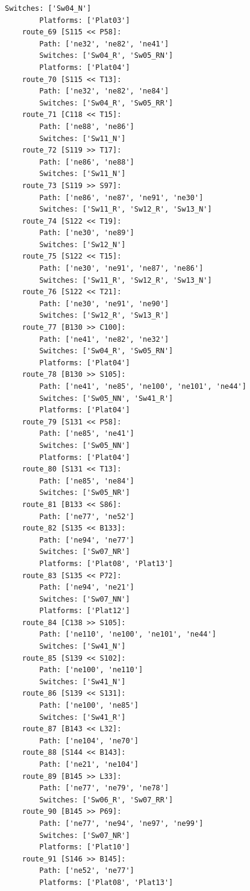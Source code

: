 \begin{lstlisting}[language = {}, tabsize=4, basicstyle=\footnotesize\ttfamily, showspaces=false, showstringspaces=false, caption = Routes.RNA, label = {lst:EJ3_7}]
		Switches: ['Sw04_N']
		Platforms: ['Plat03']
	route_69 [S115 << P58]:
		Path: ['ne32', 'ne82', 'ne41']
		Switches: ['Sw04_R', 'Sw05_RN']
		Platforms: ['Plat04']
	route_70 [S115 << T13]:
		Path: ['ne32', 'ne82', 'ne84']
		Switches: ['Sw04_R', 'Sw05_RR']
	route_71 [C118 << T15]:
		Path: ['ne88', 'ne86']
		Switches: ['Sw11_N']
	route_72 [S119 >> T17]:
		Path: ['ne86', 'ne88']	
		Switches: ['Sw11_N']
	route_73 [S119 >> S97]:
		Path: ['ne86', 'ne87', 'ne91', 'ne30']
		Switches: ['Sw11_R', 'Sw12_R', 'Sw13_N']
	route_74 [S122 << T19]:
		Path: ['ne30', 'ne89']
		Switches: ['Sw12_N']
	route_75 [S122 << T15]:
		Path: ['ne30', 'ne91', 'ne87', 'ne86']
		Switches: ['Sw11_R', 'Sw12_R', 'Sw13_N']
	route_76 [S122 << T21]:
		Path: ['ne30', 'ne91', 'ne90']
		Switches: ['Sw12_R', 'Sw13_R']
	route_77 [B130 >> C100]:
		Path: ['ne41', 'ne82', 'ne32']
		Switches: ['Sw04_R', 'Sw05_RN']
		Platforms: ['Plat04']
	route_78 [B130 >> S105]:	
		Path: ['ne41', 'ne85', 'ne100', 'ne101', 'ne44']
		Switches: ['Sw05_NN', 'Sw41_R']
		Platforms: ['Plat04']
	route_79 [S131 << P58]:
		Path: ['ne85', 'ne41']
		Switches: ['Sw05_NN']
		Platforms: ['Plat04']
	route_80 [S131 << T13]:
		Path: ['ne85', 'ne84']
		Switches: ['Sw05_NR']
	route_81 [B133 << S86]:
		Path: ['ne77', 'ne52']
	route_82 [S135 << B133]:
		Path: ['ne94', 'ne77']
		Switches: ['Sw07_NR']
		Platforms: ['Plat08', 'Plat13']
	route_83 [S135 << P72]:
		Path: ['ne94', 'ne21']
		Switches: ['Sw07_NN']
		Platforms: ['Plat12']
	route_84 [C138 >> S105]:
		Path: ['ne110', 'ne100', 'ne101', 'ne44']	
		Switches: ['Sw41_N']
	route_85 [S139 << S102]:
		Path: ['ne100', 'ne110']
		Switches: ['Sw41_N']
	route_86 [S139 << S131]:
		Path: ['ne100', 'ne85']
		Switches: ['Sw41_R']
	route_87 [B143 << L32]:
		Path: ['ne104', 'ne70']
	route_88 [S144 << B143]:
		Path: ['ne21', 'ne104']
	route_89 [B145 >> L33]:
		Path: ['ne77', 'ne79', 'ne78']
		Switches: ['Sw06_R', 'Sw07_RR']
	route_90 [B145 >> P69]:
		Path: ['ne77', 'ne94', 'ne97', 'ne99']
		Switches: ['Sw07_NR']
		Platforms: ['Plat10']
	route_91 [S146 >> B145]:
		Path: ['ne52', 'ne77']
		Platforms: ['Plat08', 'Plat13']
	\end{lstlisting}